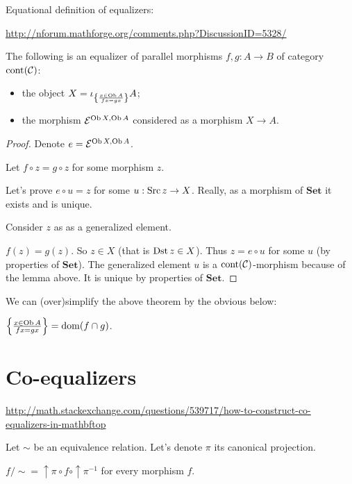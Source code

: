 Equational definition of equalizers:

\url{http://nforum.mathforge.org/comments.php?DiscussionID=5328/}

\begin{thm}
  The following is an equalizer of parallel morphisms $f, g : A \rightarrow B$
  of category $\operatorname{cont} (\mathcal{C})$:
  \begin{itemize}
    \item the object $X = \iota_{\left\{ \frac{ x \in \operatorname{Ob} A }{
    f x = g x }\right\}} A$;
    
    \item the morphism $\mathcal{E}^{\operatorname{Ob} X, \operatorname{Ob} A}$ considered
    as a morphism $X \rightarrow A$.
  \end{itemize}
\end{thm}

\begin{proof}
  Denote $e = \mathcal{E}^{\operatorname{Ob} X, \operatorname{Ob} A}$.
  
  Let $f \circ z = g \circ z$ for some morphism $z$.
  
  Let's prove $e \circ u = z$ for some $u : \operatorname{Src} z \rightarrow X$.
  Really, as a morphism of $\mathbf{Set}$ it exists and is unique.
  
  Consider $z$ as as a generalized element.
  
  $f (z) = g (z)$. So $z \in X$ (that is $\operatorname{Dst} z \in X$). Thus $z = e
  \circ u$ for some $u$ (by properties of $\mathbf{Set}$). The
  generalized element $u$ is a $\operatorname{cont} (\mathcal{C})$-morphism
  because of the lemma above. It is unique by properties of
  $\mathbf{Set}$.
\end{proof}

We can (over)simplify the above theorem by the obvious below:

\begin{obvious}
$\left\{ \frac{ x \in \operatorname{Ob} A }{ f x = g x }\right\} = \operatorname{dom} (f \cap g)$.
\end{obvious}

\section{Co-equalizers}

\url{http://math.stackexchange.com/questions/539717/how-to-construct-co-equalizers-in-mathbftop}	

Let $\sim$ be an equivalence relation. Let's denote $\pi$ its canonical
projection.

\begin{defn}
  $f / \sim = \uparrow \pi \circ f \circ \uparrow \pi^{- 1}$ for every
  morphism $f$.
\end{defn}

